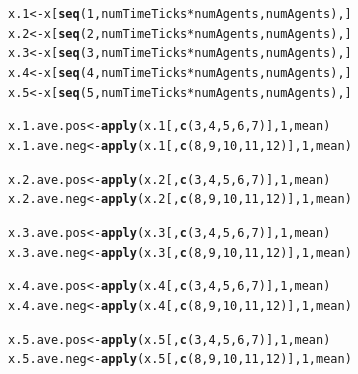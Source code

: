 \documentclass{article}\usepackage[]{graphicx}\usepackage[]{color}
\makeatletter
\newcommand{\hlnum}[1]{\textcolor[rgb]{0.686,0.059,0.569}{#1}}%
\newcommand{\hlopt}[1]{\textcolor[rgb]{0,0,0}{#1}}%
\newcommand{\hlstd}[1]{\textcolor[rgb]{0.345,0.345,0.345}{#1}}%
\newcommand{\hlkwb}[1]{\textcolor[rgb]{0.69,0.353,0.396}{#1}}%
\newcommand{\hlkwd}[1]{\textcolor[rgb]{0.737,0.353,0.396}{\textbf{#1}}}%
\newenvironment{kframe}{%
 \def\at@end@of@kframe{}%
 \ifinner\ifhmode%
  \def\at@end@of@kframe{\end{minipage}}%
  \begin{minipage}{\columnwidth}%
 \fi\fi%
 \def\FrameCommand##1{\hskip\@totalleftmargin \hskip-\fboxsep
 \colorbox{shadecolor}{##1}\hskip-\fboxsep
     \hskip-\linewidth \hskip-\@totalleftmargin \hskip\columnwidth}%
 \MakeFramed {\advance\hsize-\width
   \@totalleftmargin\z@ \linewidth\hsize
   \@setminipage}}%
 {\par\unskip\endMakeFramed%
 \at@end@of@kframe}
\newenvironment{knitrout}{}{} %
\makeatother
\begin{document}
\begin{knitrout}
\begin{kframe}
\begin{alltt}
    \hlstd{x.1} \hlkwb{<-} \hlstd{x[}\hlkwd{seq}\hlstd{(}\hlnum{1}\hlstd{, numTimeTicks} \hlopt{*} \hlstd{numAgents, numAgents), ]}
    \hlstd{x.2} \hlkwb{<-} \hlstd{x[}\hlkwd{seq}\hlstd{(}\hlnum{2}\hlstd{, numTimeTicks} \hlopt{*} \hlstd{numAgents, numAgents), ]}
    \hlstd{x.3} \hlkwb{<-} \hlstd{x[}\hlkwd{seq}\hlstd{(}\hlnum{3}\hlstd{, numTimeTicks} \hlopt{*} \hlstd{numAgents, numAgents), ]}
    \hlstd{x.4} \hlkwb{<-} \hlstd{x[}\hlkwd{seq}\hlstd{(}\hlnum{4}\hlstd{, numTimeTicks} \hlopt{*} \hlstd{numAgents, numAgents), ]}
    \hlstd{x.5} \hlkwb{<-} \hlstd{x[}\hlkwd{seq}\hlstd{(}\hlnum{5}\hlstd{, numTimeTicks} \hlopt{*} \hlstd{numAgents, numAgents), ]}

    \hlstd{x.1.ave.pos} \hlkwb{<-} \hlkwd{apply}\hlstd{(x.1[,} \hlkwd{c}\hlstd{(}\hlnum{3}\hlstd{,} \hlnum{4}\hlstd{,} \hlnum{5}\hlstd{,} \hlnum{6}\hlstd{,} \hlnum{7}\hlstd{)],} \hlnum{1}\hlstd{, mean)}
    \hlstd{x.1.ave.neg} \hlkwb{<-} \hlkwd{apply}\hlstd{(x.1[,} \hlkwd{c}\hlstd{(}\hlnum{8}\hlstd{,} \hlnum{9}\hlstd{,} \hlnum{10}\hlstd{,} \hlnum{11}\hlstd{,} \hlnum{12}\hlstd{)],} \hlnum{1}\hlstd{, mean)}

    \hlstd{x.2.ave.pos} \hlkwb{<-} \hlkwd{apply}\hlstd{(x.2[,} \hlkwd{c}\hlstd{(}\hlnum{3}\hlstd{,} \hlnum{4}\hlstd{,} \hlnum{5}\hlstd{,} \hlnum{6}\hlstd{,} \hlnum{7}\hlstd{)],} \hlnum{1}\hlstd{, mean)}
    \hlstd{x.2.ave.neg} \hlkwb{<-} \hlkwd{apply}\hlstd{(x.2[,} \hlkwd{c}\hlstd{(}\hlnum{8}\hlstd{,} \hlnum{9}\hlstd{,} \hlnum{10}\hlstd{,} \hlnum{11}\hlstd{,} \hlnum{12}\hlstd{)],} \hlnum{1}\hlstd{, mean)}

    \hlstd{x.3.ave.pos} \hlkwb{<-} \hlkwd{apply}\hlstd{(x.3[,} \hlkwd{c}\hlstd{(}\hlnum{3}\hlstd{,} \hlnum{4}\hlstd{,} \hlnum{5}\hlstd{,} \hlnum{6}\hlstd{,} \hlnum{7}\hlstd{)],} \hlnum{1}\hlstd{, mean)}
    \hlstd{x.3.ave.neg} \hlkwb{<-} \hlkwd{apply}\hlstd{(x.3[,} \hlkwd{c}\hlstd{(}\hlnum{8}\hlstd{,} \hlnum{9}\hlstd{,} \hlnum{10}\hlstd{,} \hlnum{11}\hlstd{,} \hlnum{12}\hlstd{)],} \hlnum{1}\hlstd{, mean)}

    \hlstd{x.4.ave.pos} \hlkwb{<-} \hlkwd{apply}\hlstd{(x.4[,} \hlkwd{c}\hlstd{(}\hlnum{3}\hlstd{,} \hlnum{4}\hlstd{,} \hlnum{5}\hlstd{,} \hlnum{6}\hlstd{,} \hlnum{7}\hlstd{)],} \hlnum{1}\hlstd{, mean)}
    \hlstd{x.4.ave.neg} \hlkwb{<-} \hlkwd{apply}\hlstd{(x.4[,} \hlkwd{c}\hlstd{(}\hlnum{8}\hlstd{,} \hlnum{9}\hlstd{,} \hlnum{10}\hlstd{,} \hlnum{11}\hlstd{,} \hlnum{12}\hlstd{)],} \hlnum{1}\hlstd{, mean)}

    \hlstd{x.5.ave.pos} \hlkwb{<-} \hlkwd{apply}\hlstd{(x.5[,} \hlkwd{c}\hlstd{(}\hlnum{3}\hlstd{,} \hlnum{4}\hlstd{,} \hlnum{5}\hlstd{,} \hlnum{6}\hlstd{,} \hlnum{7}\hlstd{)],} \hlnum{1}\hlstd{, mean)}
    \hlstd{x.5.ave.neg} \hlkwb{<-} \hlkwd{apply}\hlstd{(x.5[,} \hlkwd{c}\hlstd{(}\hlnum{8}\hlstd{,} \hlnum{9}\hlstd{,} \hlnum{10}\hlstd{,} \hlnum{11}\hlstd{,} \hlnum{12}\hlstd{)],} \hlnum{1}\hlstd{, mean)}


\end{alltt}
\end{kframe}
\end{knitrout}
\end{document}
